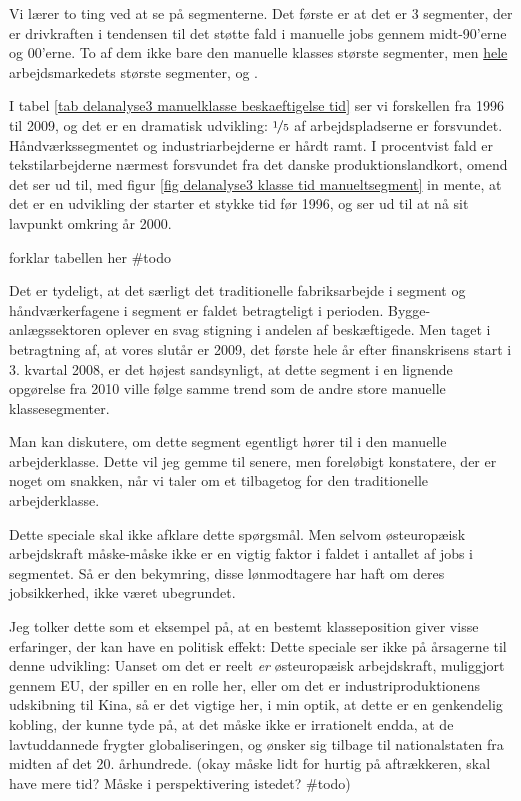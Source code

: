 Vi lærer to ting ved at se på segmenterne. Det første er at det er 3 segmenter, der er drivkraften i tendensen til det støtte fald i manuelle jobs gennem midt-90'erne og 00'erne. To af dem ikke bare den manuelle klasses største segmenter, men \underline{hele} arbejdsmarkedets største segmenter,  og .

I tabel \ref{tab delanalyse3 manuelklasse beskaeftigelse tid} ser vi forskellen fra 1996 til 2009, og det er en dramatisk udvikling: $\nicefrac{1}{5}$ af arbejdspladserne er forsvundet. Håndværkssegmentet og industriarbejderne er hårdt ramt. I procentvist fald er tekstilarbejderne nærmest forsvundet fra det danske produktionslandkort, omend det ser ud til, med figur \ref{fig delanalyse3 klasse tid manueltsegment} in mente, at det er en udvikling der starter et stykke tid før 1996, og ser ud til at nå sit lavpunkt omkring år 2000.




%

%


forklar tabellen her \#todo

Det er tydeligt, at det særligt det traditionelle fabriksarbejde i segment  og håndværkerfagene i segment  er faldet betragteligt i perioden. Bygge-anlægssektoren oplever en svag stigning i andelen af beskæftigede. Men taget i betragtning af, at vores slutår er 2009,  det første hele år efter finanskrisens start i 3. kvartal 2008, er det højest sandsynligt, at dette segment i en lignende opgørelse fra 2010 ville følge samme trend som de andre store manuelle klassesegmenter.  

Man kan diskutere, om dette segment egentligt hører til i den manuelle arbejderklasse. Dette vil jeg gemme til senere, men foreløbigt konstatere, der er noget om snakken, når vi taler om et tilbagetog for den traditionelle arbejderklasse. 

Dette speciale skal ikke afklare dette spørgsmål. Men selvom  østeuropæisk arbejdskraft måske-måske ikke er en vigtig faktor i faldet i antallet af jobs i segmentet. Så er den bekymring, disse lønmodtagere har haft om deres jobsikkerhed, ikke været ubegrundet.

Jeg tolker dette som et eksempel på, at en bestemt klasseposition giver visse erfaringer, der kan have en politisk effekt: Dette speciale ser ikke på årsagerne til denne udvikling: Uanset om det er reelt \emph{er} østeuropæisk arbejdskraft, muliggjort gennem EU, der spiller en en rolle her, eller om det er industriproduktionens udskibning til Kina, så er det vigtige her, i min optik, at dette er en genkendelig kobling, der kunne tyde på, at det måske ikke er irrationelt endda, at de lavtuddannede frygter globaliseringen, og ønsker sig tilbage til nationalstaten fra midten af det 20. århundrede. (okay måske lidt for hurtig på aftrækkeren, skal have mere tid? Måske i perspektivering istedet? \#todo)

